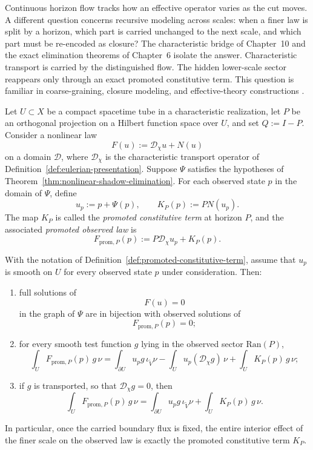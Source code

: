 Continuous horizon flow tracks how an effective operator varies as the cut
moves. A different question concerns recursive modeling across scales: when a
finer law is split by a horizon, which part is carried unchanged to the next
scale, and which part must be re-encoded as closure? The characteristic bridge
of Chapter~10 and the exact elimination theorems of Chapter~6 isolate the
answer. Characteristic transport is carried by the distinguished flow. The
hidden lower-scale sector reappears only through an exact promoted
constitutive term. This question is familiar in coarse-graining, closure
modeling, and effective-theory constructions
\cite{Goldenfeld1992,Pope2000,Antoulas2005}.

\begin{definition}
\label{def:promoted-constitutive-term}
Let $U\subset X$ be a compact spacetime tube in a characteristic realization,
let $P$ be an orthogonal projection on a Hilbert function space over $U$, and
set $Q:=I-P$. Consider a nonlinear law
\[
F(u):=\mathcal D_\chi u + N(u)
\]
on a domain $\mathcal D$, where $\mathcal D_\chi$ is the characteristic
transport operator of Definition~\ref{def:eulerian-presentation}. Suppose
$\Psi$ satisfies the hypotheses of
Theorem~\ref{thm:nonlinear-shadow-elimination}. For each observed state $p$ in
the domain of $\Psi$, define
\[
u_p:=p+\Psi(p),
\qquad
K_P(p):=PN(u_p).
\]
The map $K_P$ is called the \emph{promoted constitutive term} at horizon $P$,
and the associated \emph{promoted observed law} is
\[
F_{\mathrm{prom},P}(p):=P\mathcal D_\chi u_p + K_P(p).
\]
\end{definition}

\begin{theorem}
\label{thm:characteristic-scale-promotion}
With the notation of Definition~\ref{def:promoted-constitutive-term}, assume
that $u_p$ is smooth on $U$ for every observed state $p$ under consideration.
Then:
\begin{enumerate}[label=(\roman*), leftmargin=2em, itemsep=0.2em]
\item full solutions of
      \[
      F(u)=0
      \]
      in the graph of $\Psi$ are in bijection with observed solutions of
      \[
      F_{\mathrm{prom},P}(p)=0;
      \]
\item for every smooth test function $g$ lying in the observed sector
      $\mathrm{Ran}(P)$,
      \[
      \int_U F_{\mathrm{prom},P}(p)\,g\,\nu
      =
      \int_{\partial U}u_p g\,\iota_{\widetilde V}\nu
      -
      \int_U u_p(\mathcal D_\chi g)\,\nu
      +
      \int_U K_P(p)\,g\,\nu;
      \]
\item if $g$ is transported, so that $\mathcal D_\chi g=0$, then
      \[
      \int_U F_{\mathrm{prom},P}(p)\,g\,\nu
      =
      \int_{\partial U}u_p g\,\iota_{\widetilde V}\nu
      +
      \int_U K_P(p)\,g\,\nu.
      \]
\end{enumerate}
In particular, once the carried boundary flux is fixed, the entire interior
effect of the finer scale on the observed law is exactly the promoted
constitutive term $K_P$.
\end{theorem}

